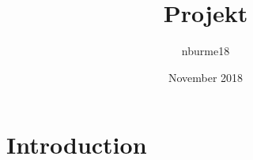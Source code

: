 \documentclass{article}
\title{Projekt}
\author{nburme18 }
\date{November 2018}
\begin{document}
\maketitle

\section{Introduction}
\end{document}
